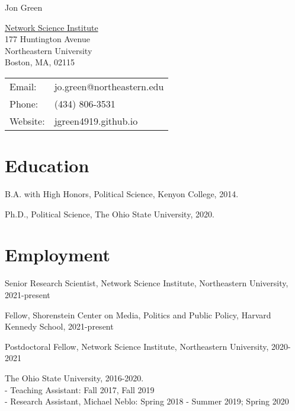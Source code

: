 \documentclass[letterpaper]{article}
\def\name{Jon Green}
\renewenvironment{itemize}{
  \begin{list}{}{
    \setlength{\leftmargin}{1.5em}
  }
}{
  \end{list}
}
\begin{document}
{\huge \name}


\vspace{0.25in}

\begin{minipage}{0.45\linewidth}
  \href{https://www.lazerlab.net/}{Network Science Institute} \\
  177 Huntington Avenue \\
  Northeastern University \\
  Boston, MA, 02115
\end{minipage}
\begin{minipage}{0.45\linewidth}
  \begin{tabular}{ll}
    Email: & jo.green@northeastern.edu \\
    Phone: & (434) 806-3531 \\
    Website: & jgreen4919.github.io \\
  \end{tabular}
\end{minipage}

\section*{Education}

\begin{itemize}
  \item B.A. with High Honors, Political Science, Kenyon College, 2014.
  \item Ph.D., Political Science, The Ohio State University, 2020. 
\end{itemize}

\section*{Employment}

\begin{itemize}
\item Senior Research Scientist, Network Science Institute, Northeastern University, 2021-present
\item Fellow, Shorenstein Center on Media, Politics and Public Policy, Harvard Kennedy School, 2021-present

\item Postdoctoral Fellow, Network Science Institute, Northeastern University, 2020-2021

\item The Ohio State University, 2016-2020.\\
- Teaching Assistant: Fall 2017, Fall 2019\\
- Research Assistant, Michael Neblo: Spring 2018 - Summer 2019; Spring 2020
\end{itemize}
\end{document}
